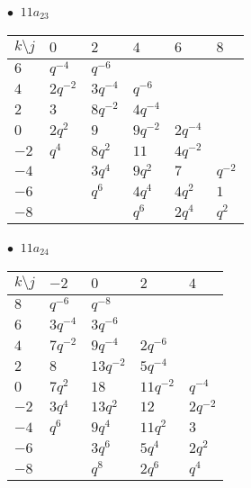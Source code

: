 \begin{minipage}{\linewidth}
$\bullet\ $ $11a_{23}$ \vspace{0.5em} \\
\begin{tabular}{l|lllll}
$k \setminus j$ & $0$ & $2$ & $4$ & $6$ & $8$ \\
\hline
$6$ & $q^{-4}$ & $q^{-6}$ &  &  &  \\
$4$ & $2q^{-2}$ & $3q^{-4}$ & $q^{-6}$ &  &  \\
$2$ & $3$ & $8q^{-2}$ & $4q^{-4}$ &  &  \\
$0$ & $2q^{2}$ & $9$ & $9q^{-2}$ & $2q^{-4}$ &  \\
$-2$ & $q^{4}$ & $8q^{2}$ & $11$ & $4q^{-2}$ &  \\
$-4$ &  & $3q^{4}$ & $9q^{2}$ & $7$ & $q^{-2}$ \\
$-6$ &  & $q^{6}$ & $4q^{4}$ & $4q^{2}$ & $1$ \\
$-8$ &  &  & $q^{6}$ & $2q^{4}$ & $q^{2}$ \\
\end{tabular}
\vspace{2em}
\end{minipage}
%
\begin{minipage}{\linewidth}
$\bullet\ $ $11a_{24}$ \vspace{0.5em} \\
\begin{tabular}{l|llll}
$k \setminus j$ & $-2$ & $0$ & $2$ & $4$ \\
\hline
$8$ & $q^{-6}$ & $q^{-8}$ &  &  \\
$6$ & $3q^{-4}$ & $3q^{-6}$ &  &  \\
$4$ & $7q^{-2}$ & $9q^{-4}$ & $2q^{-6}$ &  \\
$2$ & $8$ & $13q^{-2}$ & $5q^{-4}$ &  \\
$0$ & $7q^{2}$ & $18$ & $11q^{-2}$ & $q^{-4}$ \\
$-2$ & $3q^{4}$ & $13q^{2}$ & $12$ & $2q^{-2}$ \\
$-4$ & $q^{6}$ & $9q^{4}$ & $11q^{2}$ & $3$ \\
$-6$ &  & $3q^{6}$ & $5q^{4}$ & $2q^{2}$ \\
$-8$ &  & $q^{8}$ & $2q^{6}$ & $q^{4}$ \\
\end{tabular}
\vspace{2em}
\end{minipage}
%
